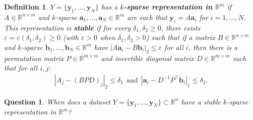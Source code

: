 \documentclass[journal, twocolumn]{IEEEtran}
\newtheorem{question}{Question}
\newtheorem{definition}{Definition}
\begin{document}
\begin{definition}\label{Uniqueness}
$Y = \{ \mathbf{y}_1, \ldots, \mathbf{y}_N\}$ has a \textbf{$k$-sparse representation in $\mathbb{R}^m$} if $A \in \mathbb{R}^{n \times m}$ and $k$-sparse $\mathbf{a}_1, \ldots, \mathbf{a}_N \in \mathbb{R}^m$ are such that $\mathbf{y}_i = A\mathbf{a}_i$ for $i = 1, \ldots, N$. This representation is \textbf{stable} if for every $\delta_1, \delta_2 \geq 0$, there exists $\varepsilon = \varepsilon(\delta_1, \delta_2) \geq 0$ (with $\varepsilon > 0$ when  $\delta_1, \delta_2 > 0$) such that if a matrix $B \in \mathbb{R}^{n \times m}$ and $k$-sparse $\mathbf{b}_1, \ldots, \mathbf{b}_N \in \mathbb{R}^m$ have \mbox{$|A\mathbf{a}_i - B\mathbf{b}_i|_2 \leq \varepsilon$} for all $i$, then
there is a permutation matrix $P \in \mathbb{R}^{m \times m}$ and invertible diagonal matrix $D \in \mathbb{R}^{m \times m}$ such that for all $i,j$:
\begin{align}\label{def1}
|A_j - (BPD)_j|_2 \leq \delta_1 \ \ \text{and} \ \ |\mathbf{a}_i - D^{-1}P^{\top}\mathbf{b}_i|_1 \leq \delta_2.
\end{align}
\end{definition}

\begin{question}\label{DUTproblem}
When does a dataset $Y = \{\mathbf{y}_1, \ldots, \mathbf{y}_N \} \subset \mathbb{R}^n$ have a stable $k$-sparse representation in $\mathbb{R}^m$?
\end{question}
\end{document}
